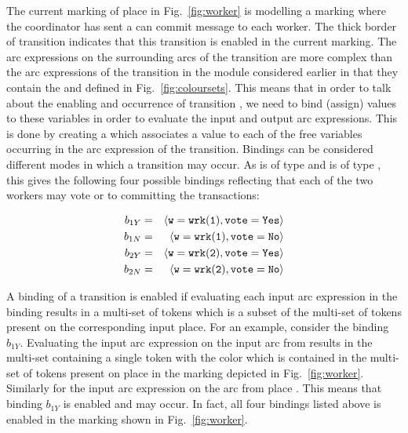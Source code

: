 The current marking of place  in
Fig.~\ref{fig:worker} is  modelling a
marking where the coordinator has sent a can commit message to each
worker. The thick border of transition 
indicates that this transition is enabled in the current marking. The
arc expressions on the surrounding arcs of the
 transition are more complex than the arc
expressions of the  transition in the
 module considered earlier in that they contain
the   and  defined in
Fig.~\ref{fig:coloursets}. This means that in order to talk about the
enabling and occurrence of transition , we
need to bind (assign) values to these variables in order to evaluate
the input and output arc expressions. This is done by creating a
 which associates a value to each of the free
variables occurring in the arc expression of the transition. Bindings
can be considered different modes in which a transition may occur.  As
 is of type  and  is of type
, this gives the following four possible bindings
reflecting that each of the two workers may vote  or
 to committing the transactions:

\begin{eqnarray*}
b_{1Y} & = & \langle {\tt{w}} = {\tt{wrk(1)}}, {\tt{vote}} = {\tt{Yes}} \rangle \\
b_{1N} & = & \langle {\tt{w}} = {\tt{wrk(1)}}, {\tt{vote}} = {\tt{No}} \rangle \\
b_{2Y} & = & \langle {\tt{w}} = {\tt{wrk(2)}}, {\tt{vote}} = {\tt{Yes}} \rangle \\
b_{2N} & = & \langle {\tt{w}} = {\tt{wrk(2)}}, {\tt{vote}} = {\tt{No}} \rangle
\end{eqnarray*}

A binding of a transition is enabled if evaluating each input arc
expression in the binding results in a multi-set of tokens which is a
subset of the multi-set of tokens present on the corresponding input
place. For an example, consider the binding $b_{1Y}$. Evaluating the
input arc expression  on the input arc from 
results in the multi-set containing a single token with the color
 which is contained in the multi-set of tokens present
on place  in the marking depicted in
Fig.~\ref{fig:worker}. Similarly for the input arc expression on the
arc from place . This means that binding $b_{1Y}$
is enabled and may occur. In fact, all four bindings listed above
is enabled in the marking shown in Fig.~\ref{fig:worker}.

